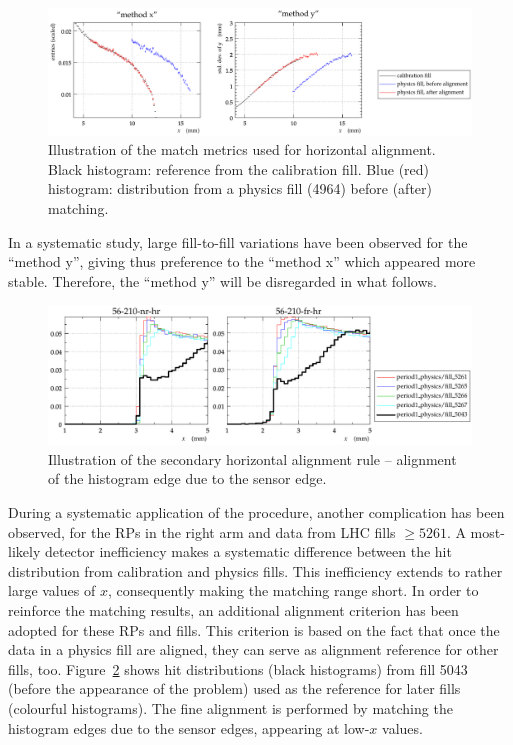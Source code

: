 \documentclass[TOTEM]{cern/cernphprep}
\begin{document}
\begin{figure}[h!]
\begin{center}
\includegraphics[width=1\hsize]{fig/physics_fills/match_method_example.pdf}
\caption{%
Illustration of the match metrics used for horizontal alignment. Black histogram: reference from the calibration fill. Blue (red) histogram: distribution from a physics fill (4964) before (after) matching.
}
\label{fig:hor_match_method}
\end{center}
\end{figure}

In a systematic study, large fill-to-fill variations have been observed for the ``method y'', giving thus preference to the ``method x'' which appeared more stable. Therefore, the ``method y'' will be disregarded in what follows.

\begin{figure}[h!]
\begin{center}
\includegraphics[width=0.9\hsize]{fig/physics_fills/x_alignment_secondary_method.pdf}
\caption{%
Illustration of the secondary horizontal alignment rule -- alignment of the histogram edge due to the sensor edge.
}
\label{fig:hor_secondary_method}
\end{center}
\end{figure}

During a systematic application of the procedure, another complication has been observed, for the RPs in the right arm and data from LHC fills $\ge 5261$. A most-likely detector inefficiency makes a systematic difference between the hit distribution from calibration and physics fills. This inefficiency extends to rather large values of $x$, consequently making the matching range short. In order to reinforce the matching results, an additional alignment criterion has been adopted for these RPs and fills. This criterion is based on the fact that once the data in a physics fill are aligned, they can serve as alignment reference for other fills, too. Figure~\ref{fig:hor_secondary_method} shows hit distributions (black histograms) from fill 5043 (before the appearance of the problem) used as the reference for later fills (colourful histograms). The fine alignment is performed by matching the histogram edges due to the sensor edges, appearing at low-$x$ values.
\end{document}

